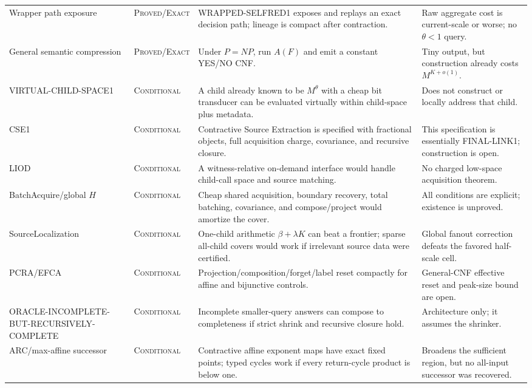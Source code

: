 \documentclass[11pt]{article}
\newcommand{\Exact}{\textsc{Proved/Exact}}
\newcommand{\Cond}{\textsc{Conditional}}
\begin{document}
\begin{longtable}{p{}p{}p{}p{}}
\rowcolor{exactgreen}
Wrapper path exposure & \Exact & WRAPPED-SELFRED1 exposes and replays an exact decision path; lineage is compact after contraction. & Raw aggregate cost is current-scale or worse; no $\theta<1$ query.\\
\rowcolor{exactgreen}
General semantic compression & \Exact & Under $P=NP$, run $A(F)$ and emit a constant YES/NO CNF. & Tiny output, but construction already costs $M^{K+o(1)}$.\\
\rowcolor{exactgreen}
VIRTUAL-CHILD-SPACE1 & \Cond & A child already known to be $M^\theta$ with a cheap bit transducer can be evaluated virtually within child-space plus metadata. & Does not construct or locally address that child.\\

\rowcolor{condblue}
CSE1 & \Cond & Contractive Source Extraction is specified with fractional objects, full acquisition charge, covariance, and recursive closure. & This specification is essentially FINAL-LINK1; construction is open.\\
\rowcolor{condblue}
LIOD & \Cond & A witness-relative on-demand interface would handle child-call space and source matching. & No charged low-space acquisition theorem.\\
\rowcolor{condblue}
BatchAcquire/global $H$ & \Cond & Cheap shared acquisition, boundary recovery, total batching, covariance, and compose/project would amortize the cover. & All conditions are explicit; existence is unproved.\\
\rowcolor{condblue}
SourceLocalization & \Cond & One-child arithmetic $\beta+\lambda K$ can beat a frontier; sparse all-child covers would work if irrelevant source data were certified. & Global fanout correction defeats the favored half-scale cell.\\
\rowcolor{condblue}
PCRA/EFCA & \Cond & Projection/composition/forget/label reset compactly for affine and bijunctive controls. & General-CNF effective reset and peak-size bound are open.\\
\rowcolor{condblue}
ORACLE-INCOMPLETE-BUT-RECURSIVELY-COMPLETE & \Cond & Incomplete smaller-query answers can compose to completeness if strict shrink and recursive closure hold. & Architecture only; it assumes the shrinker.\\
\rowcolor{condblue}
ARC/max-affine successor & \Cond & Contractive affine exponent maps have exact fixed points; typed cycles work if every return-cycle product is below one. & Broadens the sufficient region, but no all-input successor was recovered.\\


\end{longtable}
\end{document}
